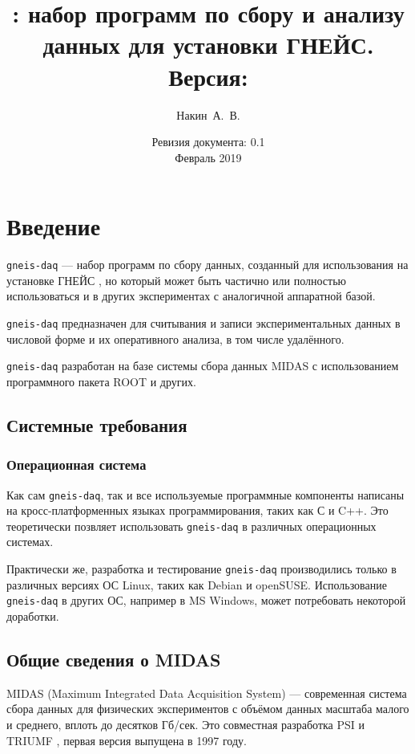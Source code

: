 \documentclass[12pt, a4paper, oneside, onecolumn]{book}
\title{\GD{}: набор программ по сбору и анализу данных для установки ГНЕЙС. \\
Версия: \GDVER
}
\author{Накин~А.~В.}
\date{Ревизия документа: 0.1\\Февраль 2019}
\newcommand{\GD}{{\tt gneis-daq}}
\newcommand{\MIDAS}{\mbox{MIDAS}}
\begin{document}
\maketitle

\tableofcontents

\chapter{Введение}

\GD{} --- набор программ по сбору данных, созданный для использования на установке ГНЕЙС \cite{shcherb2018}, но который может быть частично или полностью  использоваться и в других экспериментах с аналогичной аппаратной базой.

\GD{} предназначен для считывания и записи экспериментальных данных в числовой форме и их оперативного анализа, в том числе удалённого.

\GD{} разработан на базе системы сбора данных \MIDAS{} \cite{midas} с использованием программного пакета ROOT \cite{RootHome} и других.

\section{Системные требования}

\subsection{Операционная система}

Как сам \GD{}, так и все используемые программные компоненты написаны на кросс-платформенных языках программирования, таких как С и C++. Это теоретически позвляет использовать \GD{} в различных операционных системах.

Практически же, разработка и тестирование \GD{} производились только в различных версиях ОС Linux, таких как Debian и openSUSE. Использование \GD{} в других ОС, например в MS Windows, может потребовать некоторой доработки.

\section{Общие сведения о \MIDAS{}}

\MIDAS{} (Maximum Integrated Data Acquisition System) --- современная система сбора данных для физических экспериментов с объёмом данных масштаба малого и среднего, вплоть до десятков Гб/сек. Это совместная разработка PSI \cite{psi} и TRIUMF \cite{triumf}, первая версия выпущена в 1997 году.
\end{document}
